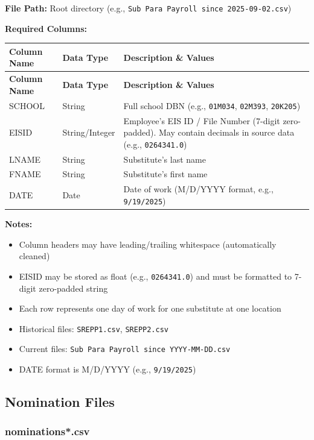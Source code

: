 \documentclass[12pt,letterpaper]{article}
\begin{document}
\textbf{File Path:} Root directory (e.g., \texttt{Sub Para Payroll since 2025-09-02.csv})

\textbf{Required Columns:}

\begin{longtable}{p{3.5cm}p{2.5cm}p{7cm}}
\toprule
\textbf{Column Name} & \textbf{Data Type} & \textbf{Description \& Values} \\
\midrule
\endfirsthead
\toprule
\textbf{Column Name} & \textbf{Data Type} & \textbf{Description \& Values} \\
\midrule
\endhead
SCHOOL & String & Full school DBN (e.g., \texttt{01M034}, \texttt{02M393}, \texttt{20K205}) \\
\midrule
EISID & String/Integer & Employee's EIS ID / File Number (7-digit zero-padded). May contain decimals in source data (e.g., \texttt{0264341.0}) \\
\midrule
LNAME & String & Substitute's last name \\
\midrule
FNAME & String & Substitute's first name \\
\midrule
DATE & Date & Date of work (M/D/YYYY format, e.g., \texttt{9/19/2025}) \\
\bottomrule
\end{longtable}

\textbf{Notes:}
\begin{itemize}[leftmargin=*]
    \item Column headers may have leading/trailing whitespace (automatically cleaned)
    \item EISID may be stored as float (e.g., \texttt{0264341.0}) and must be formatted to 7-digit zero-padded string
    \item Each row represents one day of work for one substitute at one location
    \item Historical files: \texttt{SREPP1.csv}, \texttt{SREPP2.csv}
    \item Current files: \texttt{Sub Para Payroll since YYYY-MM-DD.csv}
    \item DATE format is M/D/YYYY (e.g., \texttt{9/19/2025})
\end{itemize}

\subsection{Nomination Files}

\subsubsection{nominations*.csv}
\end{document}

